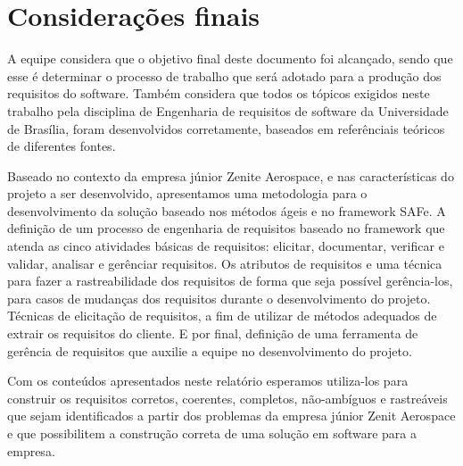 \chapter[Considera{\c c}{\~o}es finais]{Considerações finais}

A equipe considera que o objetivo final deste documento foi alcançado, sendo que esse é determinar o processo de trabalho que será adotado para a produção dos requisitos do software. Também considera que todos os tópicos exigidos neste trabalho pela disciplina de Engenharia de requisitos de software da Universidade de Brasília, foram desenvolvidos corretamente, baseados em referênciais teóricos de diferentes fontes.

Baseado no contexto da empresa júnior Zenite Aerospace, e nas características do projeto a ser desenvolvido, apresentamos uma metodologia para o desenvolvimento da solução baseado nos métodos ágeis e no framework SAFe. A definição de um processo de engenharia de requisitos baseado no framework que atenda as cinco atividades básicas de requisitos: elicitar, documentar, verificar e validar, analisar e gerênciar requisitos. Os atributos de requisitos e uma técnica para fazer a rastreabilidade dos requisitos de forma que seja possível gerência-los, para casos de mudanças dos requisitos durante o desenvolvimento do projeto. Técnicas de elicitação de requisitos, a fim de utilizar de métodos adequados de extrair os requisitos do cliente. E por final, definição de uma ferramenta de gerência de requisitos que auxilie a equipe no desenvolvimento do projeto.

Com os conteúdos apresentados neste relatório esperamos utiliza-los para construir os requisitos corretos, coerentes, completos, não-ambíguos e rastreáveis que sejam identificados a partir dos problemas da empresa júnior Zenit Aerospace e que possibilitem a construção correta de uma solução em software para a empresa.
